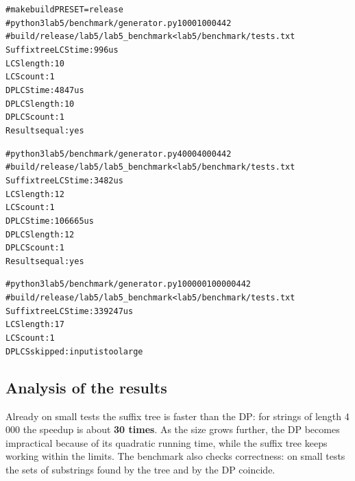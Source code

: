 \begin{alltt}
# make build PRESET=release
# python3 lab5/benchmark/generator.py 1000 1000 4 42
# build/release/lab5/lab5_benchmark < lab5/benchmark/tests.txt
Suffix tree LCS time: 996us
LCS length: 10
LCS count: 1
DP LCS time: 4847us
DP LCS length: 10
DP LCS count: 1
Results equal: yes

# python3 lab5/benchmark/generator.py 4000 4000 4 42
# build/release/lab5/lab5_benchmark < lab5/benchmark/tests.txt
Suffix tree LCS time: 3482us
LCS length: 12
LCS count: 1
DP LCS time: 106665us
DP LCS length: 12
DP LCS count: 1
Results equal: yes

# python3 lab5/benchmark/generator.py 100000 100000 4 42
# build/release/lab5/lab5_benchmark < lab5/benchmark/tests.txt
Suffix tree LCS time: 339247us
LCS length: 17
LCS count: 1
DP LCS skipped: input is too large
\end{alltt}

\subsection{Analysis of the results}

Already on small tests the suffix tree is faster than the DP: for strings of length 4\,000 the
speedup is about \textbf{30 times}. As the size grows further, the DP becomes impractical because
of its quadratic running time, while the suffix tree keeps working within the limits. The
benchmark also checks correctness: on small tests the sets of substrings found by the tree and by
the DP coincide.

\pagebreak
